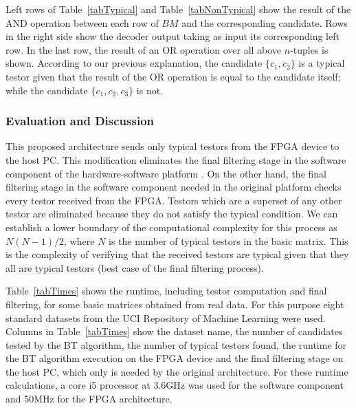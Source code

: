 \documentclass[authoryear,11pt]{elsarticle}
\begin{document}
	Left rows of Table~\ref{tabTypical} and Table~\ref{tabNonTypical} show the result of the AND operation 
	between each row of $BM$ and the corresponding candidate. Rows in the right side show the decoder output 
	taking as input its corresponding left row. In the last row, the result of an OR operation over all 
	above $n$-tuples is shown. According to our previous explanation, the candidate $\{c_1,c_2\}$ is a 
	typical testor given that the result of the OR operation is equal to the candidate itself; while the
	candidate $\{c_1,c_2,c_3\}$ is not.
	
\subsubsection{Evaluation and Discussion}
	This proposed architecture sends only typical testors from the FPGA device to the 
	host PC. This modification eliminates the final filtering stage in the software component of the 
	hardware-software platform \citep{Rojas12}. On the other hand, the final filtering stage in the 
	software component needed in the original platform \citep{Rojas12} checks 
	every testor received from the FPGA. Testors which are a superset of any other testor are 
	eliminated because they do not satisfy the typical condition. We 
	can establish a lower boundary of the computational complexity for this process as $N(N-1)/2$, 
	where $N$ is the number of typical testors in the basic matrix. This is the complexity of verifying that
	the received testors are typical given that they all are typical testors (best case of the final filtering 
	process).
	
	Table~\ref{tabTimes} shows the runtime, including testor computation and final filtering, 
	for some basic matrices obtained from real data. For this purpose eight standard datasets from the UCI
	Repository of Machine Learning \citep{Bache13} were used.
	Columns in Table~\ref{tabTimes} show the dataset name, the number of candidates tested by the BT algorithm,
	the number of typical testors found, the runtime for the BT algorithm execution on the 
	FPGA device and the final filtering stage on the host PC, which only is needed by the original architecture.
	For these runtime calculations, a core i5 processor at 3.6GHz was used for the software component and 50MHz for 
	the FPGA architecture.
	
\end{document}
